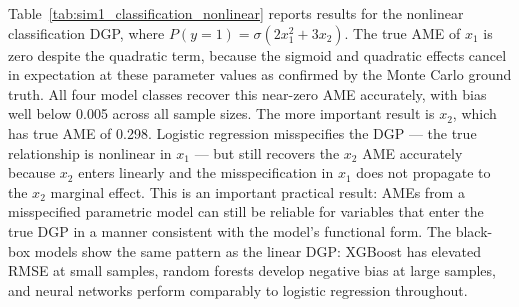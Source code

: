 \documentclass[12pt,a4paper]{article}
\numberwithin{equation}{section}
\theoremstyle{plain}
\theoremstyle{definition}
\begin{document}
	Table~\ref{tab:sim1_classification_nonlinear} reports results for the nonlinear classification DGP, where $P(y=1) = \sigma(2x_1^2 + 3x_2)$. The true AME of $x_1$ is zero despite the quadratic term, because the sigmoid and quadratic effects cancel in expectation at these parameter values as confirmed by the Monte Carlo ground truth. All four model classes recover this near-zero AME accurately, with bias well below 0.005 across all sample sizes. The more important result is $x_2$, which has true AME of 0.298. Logistic regression misspecifies the DGP --- the true relationship is nonlinear in $x_1$ --- but still recovers the $x_2$ AME accurately because $x_2$ enters linearly and the misspecification in $x_1$ does not propagate to the $x_2$ marginal effect. This is an important practical result: AMEs from a misspecified parametric model can still be reliable for variables that enter the true DGP in a manner consistent with the model's functional form. The black-box models show the same pattern as the linear DGP: XGBoost has elevated RMSE at small samples, random forests develop negative bias at large samples, and neural networks perform comparably to logistic regression throughout.
	
\end{document}
